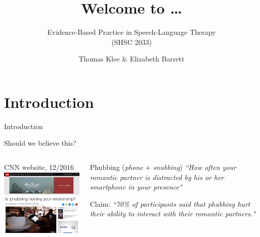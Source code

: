 \documentclass{beamer}
\title{Welcome to \dots}
\subtitle{}
\author{Evidence-Based Practice in Speech-Language Therapy \\ (SHSC 2033)}
\institute{Session 1}
\date{Thomas Klee \& Elizabeth Barrett}
\begin{document}
\begin{frame}
	\titlepage
\end{frame}

\section*{Introduction}

\begin{frame}
\begin{center}
\Huge{Introduction}
\end{center}
\end{frame}

\begin{frame}{Should we believe this?}
	\begin{columns}[T]
		\begin{column}{.5\textwidth}
			\begin{block}{CNN website, 12/2016} 
			\includegraphics[width=5cm]{images/phubbing_2016.png}
			\end{block}
		\end{column}
		\begin{column}{.5\textwidth}
			\begin{block}{Phubbing (\emph{phone} + \emph{snubbing})} 
			\emph{``How often your romantic partner is distracted by his or her smartphone in your presence"} \\
			\end{block}
 			\begin{block}{Claim:}
			\emph{``70\% of participants said that phubbing hurt their ability to interact with their romantic partners."}
			\end{block}
		\end{column}
	\end{columns}
\end{frame}
\end{document}
